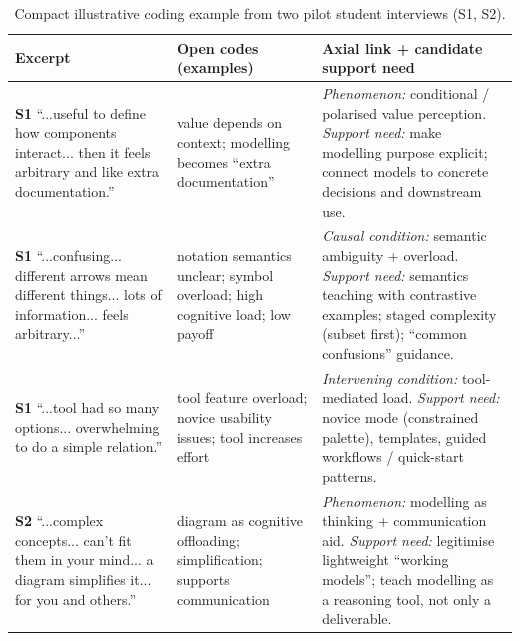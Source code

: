 \begin{table}[t]
\small
\setlength{\tabcolsep}{4pt}
\renewcommand{\arraystretch}{1.12}
\caption{Compact illustrative coding example from two pilot student interviews (S1, S2).}
\label{tab:coding_example_students_compact}
\begin{tabularx}{\textwidth}{p{} X X}
\toprule
\textbf{Excerpt} & \textbf{Open codes (examples)} & \textbf{Axial link + candidate support need} \\
\midrule

\textbf{S1} “...useful to define how components interact... then it feels arbitrary and like extra documentation.” &
value depends on context; modelling becomes “extra documentation” &
\emph{Phenomenon:} conditional / polarised value perception.\newline
\emph{Support need:} make modelling purpose explicit; connect models to concrete decisions and downstream use. \\

\addlinespace

\textbf{S1} “...confusing... different arrows mean different things... lots of information... feels arbitrary...” &
notation semantics unclear; symbol overload; high cognitive load; low payoff &
\emph{Causal condition:} semantic ambiguity + overload.\newline
\emph{Support need:} semantics teaching with contrastive examples; staged complexity (subset first); “common confusions” guidance. \\

\addlinespace

\textbf{S1} “...tool had so many options... overwhelming to do a simple relation.” &
tool feature overload; novice usability issues; tool increases effort &
\emph{Intervening condition:} tool-mediated load.\newline
\emph{Support need:} novice mode (constrained palette), templates, guided workflows / quick-start patterns. \\

\midrule

\textbf{S2} “...complex concepts... can’t fit them in your mind... a diagram simplifies it... for you and others.” &
diagram as cognitive offloading; simplification; supports communication &
\emph{Phenomenon:} modelling as thinking + communication aid.\newline
\emph{Support need:} legitimise lightweight “working models”; teach modelling as a reasoning tool, not only a deliverable. \\


\end{tabularx}
\end{table}
